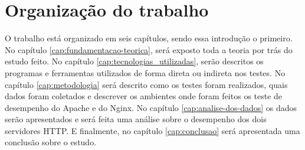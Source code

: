 \section{Organização do trabalho}
O trabalho está organizado em seis capítulos, sendo essa introdução o primeiro. 
No capítulo \ref{cap:fundamentacao-teorica}, será exposto toda a teoria por 
trás do estudo feito. No capítulo \ref{cap:tecnologias_utilizadas}, serão 
descritos os programas e ferramentas utilizados de forma direta ou indireta nos 
testes. No capítulo \ref{cap:metodologia} será descrito como os testes foram 
realizados, quais dados foram coletados e descrever os ambientes onde foram 
feitos os teste de desempenho do Apache e do Nginx. No capítulo 
\ref{cap:analise-dos-dados} os dados serão apresentados e 
será feita uma análise sobre o desempenho dos dois servidores HTTP. E 
finalmente, no capítulo \ref{cap:conclusao} será apresentada uma conclusão 
sobre o estudo.\\
